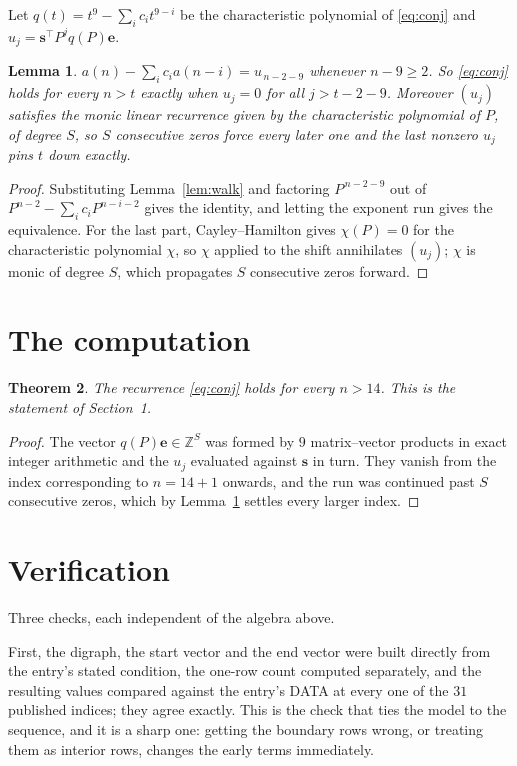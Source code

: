 \documentclass[11pt,a4paper]{article}
\theoremstyle{plain}
\newtheorem{theorem}{Theorem}
\newtheorem{lemma}[theorem]{Lemma}
\theoremstyle{definition}
\begin{document}
Let $q(t)=t^{9}-\sum_i c_i t^{9-i}$ be the characteristic polynomial of
\eqref{eq:conj} and $u_j=\mathbf{s}^{\!\top}P^{j}q(P)\mathbf{e}$.

\begin{lemma}\label{lem:crit}
$a(n)-\sum_i c_i a(n-i)=u_{\,n-2-9}$ whenever $n-9\ge2$. So \eqref{eq:conj}
holds for every $n>t$ exactly when $u_j=0$ for all $j>t-2-9$. Moreover $(u_j)$
satisfies the monic linear recurrence given by the characteristic polynomial of $P$, of
degree $S$, so $S$ consecutive zeros force every later one and the last nonzero $u_j$ pins
$t$ down exactly.
\end{lemma}

\begin{proof}
Substituting Lemma~\ref{lem:walk} and factoring $P^{\,n-2-9}$ out of
$P^{n-2}-\sum_i c_i P^{n-i-2}$ gives the identity, and letting the exponent run gives the
equivalence. For the last part, Cayley--Hamilton gives $\chi(P)=0$ for the characteristic
polynomial $\chi$, so $\chi$ applied to the shift annihilates $(u_j)$; $\chi$ is monic of
degree $S$, which propagates $S$ consecutive zeros forward.
\end{proof}

\section{The computation}

\begin{theorem}
The recurrence \eqref{eq:conj} holds for every $n>14$. This is the statement of
Section~1.
\end{theorem}

\begin{proof}
The vector $q(P)\mathbf{e}\in\mathbb{Z}^{S}$ was formed by $9$ matrix--vector
products in exact integer arithmetic and the $u_j$ evaluated against $\mathbf{s}$ in turn.
They vanish from the index corresponding to $n=14+1$ onwards, and the run was continued
past $S$ consecutive zeros, which by Lemma~\ref{lem:crit} settles every larger index.
\end{proof}

\section{Verification}

Three checks, each independent of the algebra above.

First, the digraph, the start vector and the end vector were built directly from the
entry's stated condition, the one-row count computed separately, and the resulting values
compared against the entry's DATA at every one of the $31$ published indices; they
agree exactly. This is the check that ties the model to the sequence, and it is a sharp one:
getting the boundary rows wrong, or treating them as interior rows, changes the early terms
immediately.
\end{document}
